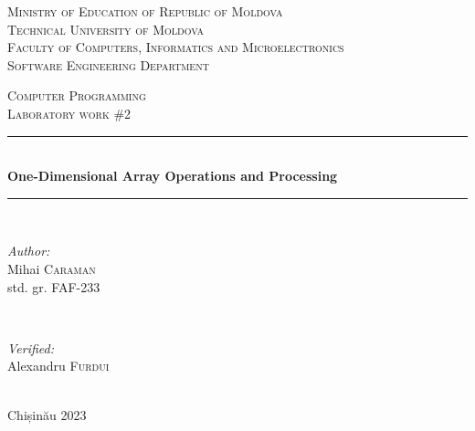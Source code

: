 \documentclass[12pt]{article}
\begin{document}
\begin{titlepage}
   \begin{center}
    \textsc{\large Ministry of Education of Republic of Moldova}\\[0.5cm]
    \textsc{\large Technical University of Moldova}\\[0.5cm]
    \textsc{\large Faculty of Computers, Informatics and Microelectronics}\\[0.5cm]
    \textsc{\large Software Engineering Department}\\[1.2cm]
    
    \vspace{25 mm}
    
    \textsc{\Large Computer Programming}\\[0.5cm]
    \textsc{\large Laboratory work \#2}\\[0.5cm]    %
    
    \newcommand{\HRule}{\rule{\linewidth}{0.5mm}}
    \vspace{10 mm}
    \HRule \\[0.4cm]
    { \LARGE \bfseries One-Dimensional Array Operations and Processing }\\[0.4cm] %
    \HRule \\[1.5cm]
    
    \vspace{10mm}
    
    \begin{minipage}[t]{0.4\textwidth}
    \begin{flushleft} \large
    \emph{Author:} \\
    Mihai \textsc{Caraman}\\                         %
    std. gr. FAF-233                                %
    \end{flushleft}
    \end{minipage}
    ~
    \begin{minipage}[t]{0.4\textwidth}
    \begin{flushright} \large
    \emph{Verified:} \\
    Alexandru \textsc{Furdui}\\
    \end{flushright}
    \end{minipage}\\[3cm]
    
    \vspace{5 mm}
    \large Chișinău 2023\\[0.5cm]
    
    \vfill
    \end{center}
\end{titlepage}
\end{document}
